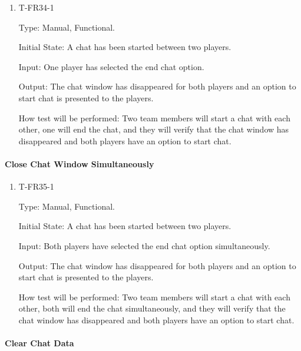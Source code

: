 \documentclass[12pt, titlepage]{article}
\begin{document}
        \begin{enumerate}

        \item{T-FR34-1\\}

            Type: Manual, Functional.
            					
            Initial State: A chat has been started between two players.
            					
            Input: One player has selected the end chat option.
            					
            Output: The chat window has disappeared for both players and an option to start chat is presented to the players.

            How test will be performed: Two team members will start a chat with each other, one will end the chat, and they will verify that the chat window has disappeared and both players have an option to start chat.

        \end{enumerate}
        
    \paragraph{Close Chat Window Simultaneously}

        \begin{enumerate}

        \item{T-FR35-1\\}

            Type: Manual, Functional.
            					
            Initial State: A chat has been started between two players.
            					
            Input: Both players have selected the end chat option simultaneously.
            					
            Output: The chat window has disappeared for both players and an option to start chat is presented to the players.

            How test will be performed: Two team members will start a chat with each other, both will end the chat simultaneously, and they will verify that the chat window has disappeared and both players have an option to start chat.

        \end{enumerate}
    
    \paragraph{Clear Chat Data}
\end{document}
